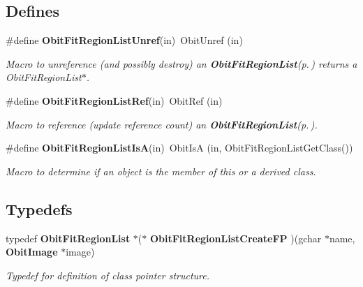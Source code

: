 \subsection*{Defines}
\begin{CompactItemize}
\item 
\#define {\bf Obit\-Fit\-Region\-List\-Unref}(in)\ Obit\-Unref (in)
\begin{CompactList}\small\item\em Macro to unreference (and possibly destroy) an {\bf Obit\-Fit\-Region\-List}{\rm (p.\,\pageref{structObitFitRegionList})} returns a Obit\-Fit\-Region\-List$\ast$. \item\end{CompactList}\item 
\#define {\bf Obit\-Fit\-Region\-List\-Ref}(in)\ Obit\-Ref (in)
\begin{CompactList}\small\item\em Macro to reference (update reference count) an {\bf Obit\-Fit\-Region\-List}{\rm (p.\,\pageref{structObitFitRegionList})}. \item\end{CompactList}\item 
\#define {\bf Obit\-Fit\-Region\-List\-Is\-A}(in)\ Obit\-Is\-A (in, Obit\-Fit\-Region\-List\-Get\-Class())
\begin{CompactList}\small\item\em Macro to determine if an object is the member of this or a derived class. \item\end{CompactList}\end{CompactItemize}
\subsection*{Typedefs}
\begin{CompactItemize}
\item 
typedef {\bf Obit\-Fit\-Region\-List} $\ast$($\ast$ {\bf Obit\-Fit\-Region\-List\-Create\-FP} )(gchar $\ast$name, {\bf Obit\-Image} $\ast$image)
\begin{CompactList}\small\item\em Typedef for definition of class pointer structure. \item\end{CompactList}\end{CompactItemize}
